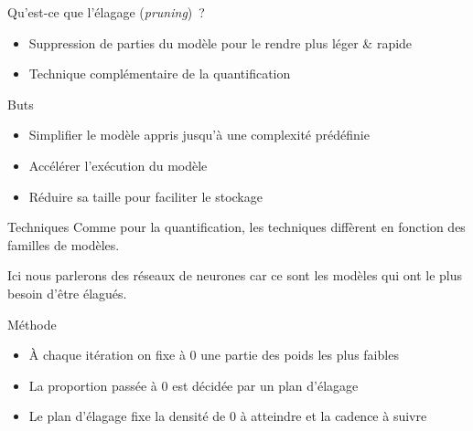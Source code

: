 \begin{frame}{Qu'est-ce que l'élagage (\textit{pruning})~?}
  \begin{itemize}
    \item Suppression de parties du modèle pour le rendre plus léger \& rapide
    \item Technique complémentaire de la quantification
  \end{itemize}
\end{frame}

\begin{frame}{Buts}
  \begin{itemize}
    \item Simplifier le modèle appris jusqu'à une complexité prédéfinie
    \item Accélérer l'exécution du modèle
    \item Réduire sa taille pour faciliter le stockage
  \end{itemize}
\end{frame}

\begin{frame}{Techniques}
  Comme pour la quantification, les techniques diffèrent en fonction des familles de modèles.

  Ici nous parlerons des réseaux de neurones car ce sont les modèles qui ont le plus besoin d’être élagués.
\end{frame}

\begin{frame}{Méthode}
  \begin{itemize}
    \item À chaque itération on fixe à 0 une partie des poids les plus faibles
    \item La proportion passée à 0 est décidée par un plan d'élagage
    \item Le plan d'élagage fixe la densité de 0 à atteindre et la cadence à suivre
  \end{itemize}
\end{frame}

